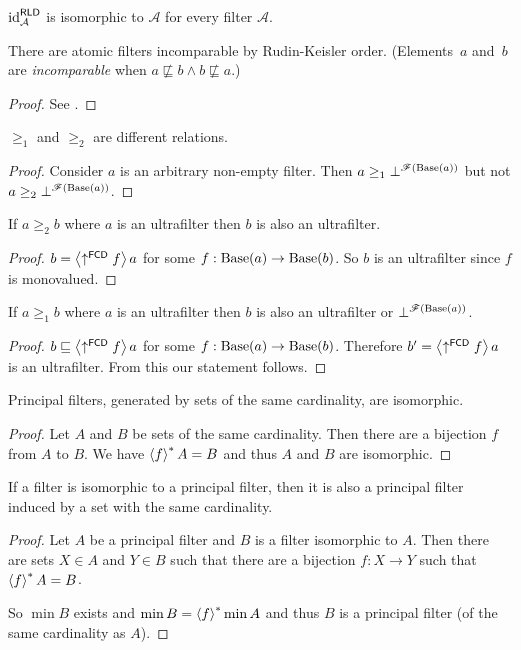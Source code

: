 \begin{cor}
$\operatorname{id}_{\mathcal{A}}^{\mathsf{RLD}}$ is isomorphic to $\mathcal{A}$
for every filter $\mathcal{A}$.\end{cor}
\begin{thm}
There are atomic filters incomparable by Rudin-Keisler order. (Elements~$a$
and~$b$ are \emph{incomparable} when $a\nsqsubseteq b\land b\nsqsubseteq a$.)\end{thm}
\begin{proof}
See \cite{Gryzlov1997151}.\end{proof}
\begin{thm}
$\ge_{1}$ and $\ge_{2}$ are different relations.\end{thm}
\begin{proof}
Consider $a$ is an arbitrary non-empty filter. Then $a\ge_{1}\bot^{\mathscr{F}(\operatorname{Base}(a))}$
but not $a\ge_{2}\bot^{\mathscr{F}(\operatorname{Base}(a))}$.\end{proof}
\begin{prop}
If $a\ge_{2}b$ where $a$ is an ultrafilter then $b$ is also an
ultrafilter.\end{prop}
\begin{proof}
$b=\left\langle \uparrow^{\mathsf{FCD}}f\right\rangle a$ for some $f:\operatorname{Base}(a)\rightarrow\operatorname{Base}(b)$.
So $b$ is an ultrafilter since $f$ is monovalued.\end{proof}
\begin{cor}
If $a\ge_{1}b$ where $a$ is an ultrafilter then $b$ is also an
ultrafilter or $\bot^{\mathscr{F}(\operatorname{Base}(a))}$.\end{cor}
\begin{proof}
$b\sqsubseteq\left\langle \uparrow^{\mathsf{FCD}}f\right\rangle a$ for some $f:\operatorname{Base}(a)\rightarrow\operatorname{Base}(b)$.
Therefore $b'=\left\langle \uparrow^{\mathsf{FCD}}f\right\rangle a$ is an ultrafilter.
From this our statement follows.\end{proof}
\begin{prop}
Principal filters, generated by sets of the same cardinality, are
isomorphic.\end{prop}
\begin{proof}
Let $A$ and $B$ be sets of the same cardinality. Then there are
a bijection $f$ from $A$ to $B$. We have $\left\langle f\right\rangle ^{\ast}A=B$ and thus
$A$ and $B$ are isomorphic.\end{proof}
\begin{prop}
If a filter is isomorphic to a principal filter, then it is also a
principal filter induced by a set with the same cardinality.\end{prop}
\begin{proof}
Let $A$ be a principal filter and $B$ is a filter isomorphic to
$A$. Then there are sets $X\in A$ and $Y\in B$ such that there
are a bijection $f:X\rightarrow Y$ such that $\left\langle f\right\rangle ^{\ast}A=B$.

So $\min B$ exists and $\min B=\left\langle f\right\rangle ^{\ast}\min A$ and thus $B$ is
a principal filter (of the same cardinality as $A$).\end{proof}
